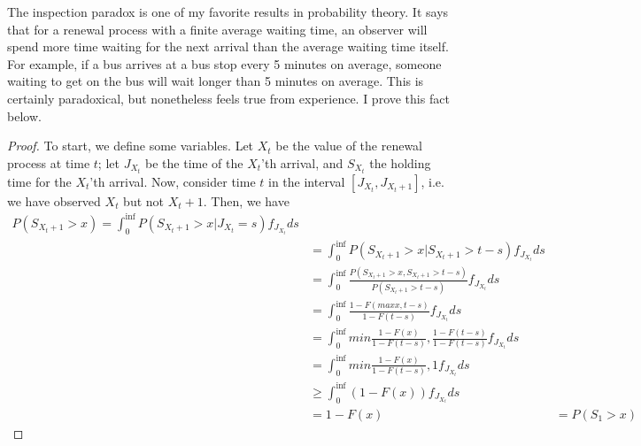 \documentclass{article}
\begin{document}
The inspection paradox is one of my favorite results in probability theory. It says that for a renewal process with a finite average waiting time, 
an observer will spend more time waiting for the next arrival than the average waiting time itself. For example, if a bus arrives at a bus stop 
every 5 minutes on average, someone waiting to get on the bus will wait longer than 5 minutes on average. This is certainly paradoxical, but nonetheless 
feels true from experience. I prove this fact below. 

\begin{proof}
    To start, we define some variables. Let $X_t$ be the value of the renewal process at time $t$; let $J_{X_t}$ be the time of the $X_t$'th arrival, 
    and $S_{X_t}$ the holding time for the $X_t$'th arrival. Now, consider time $t$ in the interval $[J_{X_t}, J_{{X_t}+1}]$, i.e. we have observed 
    $X_t$ but not $X_t + 1$. Then, we have
  \begin{align*}
    P(S_{{X_t}+1} > x) = \int_{0}^{\inf} P(S_{{X_t}+1} > x | J_{X_t} = s) f_{J_{X_t}} ds \\
    &= \int_{0}^{\inf} P(S_{{X_t}+1} > x | S_{{X_t}+1} > t - s) f_{J_{X_t}} ds \\
    &= \int_{0}^{\inf} \frac{P(S_{{X_t}+1} > x, S_{{X_t}+1} > t - s)}{P(S_{{X_t}+1} > t - s)} f_{J_{X_t}} ds \\
    &= \int_{0}^{\inf} \frac{1 - F(max{x, t -s})}{1 - F(t -s)} f_{J_{X_t}} ds \\
    &= \int_{0}^{\inf} min{\frac{1 - F(x)}{1 - F(t - s)}, \frac{1 - F(t -s )}{1 - F(t - s)}} f_{J_{X_t}} ds \\
    &= \int_{0}^{\inf} min{\frac{1 - F(x)}{1 - F(t - s)}, 1} f_{J_{X_t}} ds \\
    &\geq \int_{0}^{\inf} (1 - F(x)) f_{J_{X_t}} ds \\
    &= 1 - F(x)
    &= P(S_{1} > x)
  \end{align*}
\end{proof}
\end{document}
